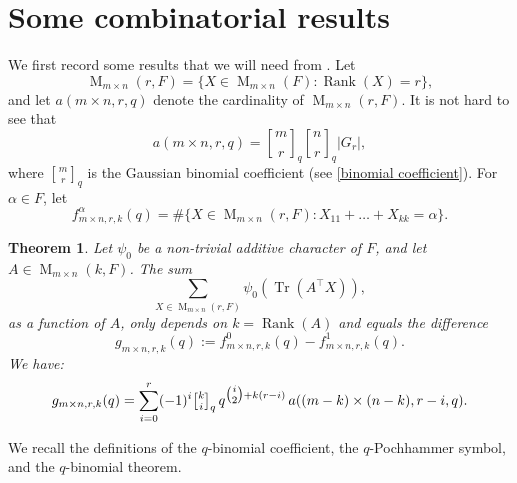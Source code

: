 \documentclass[reqno]{amsart}
\newtheorem{theorem}{Theorem}[section]
\theoremstyle{definition}
\theoremstyle{remark}
\numberwithin{equation}{section}
\newcommand{\stirling}[2]{\genfrac{[}{]}{0pt}{1}{#1}{#2}}
\DeclareMathOperator{\M}{M}
\DeclareMathOperator{\tr}{Tr}
\DeclareMathOperator{\Rank}{Rank}
\begin{document}
 \section{Some combinatorial  results}\label{combin}
We first record some results that we will need from \cite{LAA}. Let 
\[\M_{m \times n}(r,F)=\{X \in \M_{m \times n}(F) \colon \Rank(X)=r\}, \]
and  let $a(m\times n, r, q)$ denote the cardinality of $\M_{m\times n}(r, F)$. It is not hard to see that 
\[a(m\times n, r, q)=\stirling{m}{r}_q  \stirling{n}{r}_q |G_r|,\] where $\stirling{m}{r}_q$ is the Gaussian binomial coefficient (see \eqref{binomial coefficient}).
For $\alpha\in F$, let 
\begin{equation}
f^\alpha_{m \times n, r, k}(q)=\#\{ X\in \M_{m \times n}(r,F) \colon X_{11}+ \dots+X_{kk}=\alpha\}. 
\end{equation}
\begin{theorem} \cite[Theorem 4.2]{LAA} \label{LAA_thm}
Let $\psi_0$ be a non-trivial additive character of $F$, and let $A \in \M_{m \times n}(k, F)$. The sum 
\[ \sum_{X \in \M_{m \times n}(r,F)}  \psi_0(\tr(A^\top X)),\]
as a function of $A$, only depends on $k=\Rank(A)$ and equals the difference
\[ g_{m \times n, r, k}(q):=f^0_{m \times n, r, k}(q) - f^1_{m \times n, r,k}(q).\] We have:
\begin{equation} \label{eq:gmnrk}
    g_{m \times n,r,k}(q) = \sum_{i=0}^r (-1)^i \stirling{k}{i}_q \,  q^{\tbinom{i}{2} + k(r-i)} \, a( (m-k)\times (n-k),r-i,q).
    \end{equation}
\end{theorem}
We recall the definitions of the $q$-binomial coefficient, the $q$-Pochhammer symbol, and the $q$-binomial theorem.
\end{document}
